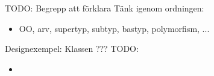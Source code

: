 


\begin{Slide}{TODO: Begrepp att förklara}
  Tänk igenom ordningen:
  \begin{itemize}
    \item OO, arv, supertyp, subtyp, bastyp, polymorfism, ... 
  \end{itemize}
\end{Slide}


\begin{Slide}{Designexempel: Klassen ???}\small
TODO:
  \begin{itemize} 
  \item 
  \end{itemize}
\end{Slide}










